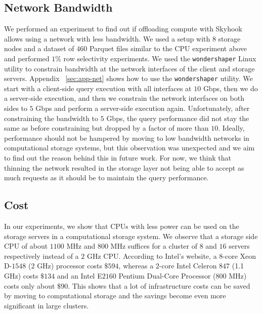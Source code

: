 \documentclass[11pt]{article}
\newcommand{\code}[1]{\colorbox{light-gray}{\texttt{#1}}}
\begin{document}
\subsection{Network Bandwidth}
We performed an experiment to find out if offloading compute with Skyhook allows using a network with less bandwidth. We used a setup with $8$ storage nodes and a dataset of $460$ Parquet files similar to the CPU experiment above and performed $1$\% row selectivity experiments. We used the \code{wondershaper} Linux utility to constrain bandwidth at the network interfaces of the client and storage servers. Appendix ~\ref{sec:app-net} shows how to use the \code{wondershaper} utility. We start with a client-side query execution with all interfaces at $10$ Gbps, then we do a server-side execution, and then we constrain the network interfaces on both sides to $5$ Gbps and perform a server-side execution again. Unfortunately, after constraining the bandwidth to $5$ Gbps, the query performance did not stay the same as before constraining but dropped by a factor of more than $10$. Ideally, performance should not be hampered by moving to low bandwidth networks in computational storage systems, but this observation was unexpected and we aim to find out the reason behind this in future work. For now, we think that thinning the network resulted in the storage layer not being able to accept as much requests as it should be to maintain the query performance.

\subsection{Cost}
In our experiments, we show that CPUs with less power can be used on the storage servers in a computational storage system. We observe that a storage side CPU of about $1100$ MHz and $800$ MHz suffices for a cluster of $8$ and $16$ servers respectively instead of a $2$ GHz CPU. According to Intel's website, a $8$-core Xeon D-$1548$ ($2$ GHz) processor costs $\$594$, whereas a $2$-core Intel Celeron $847$ (1.1 GHz) costs $\$134$ and an Intel E$2160$ Pentium Dual-Core Processor ($800$ MHz) costs only about $\$90$. This shows that a lot of infrastructure costs can be saved by moving to computational storage and the savings become even more significant in large clusters.
\end{document}
